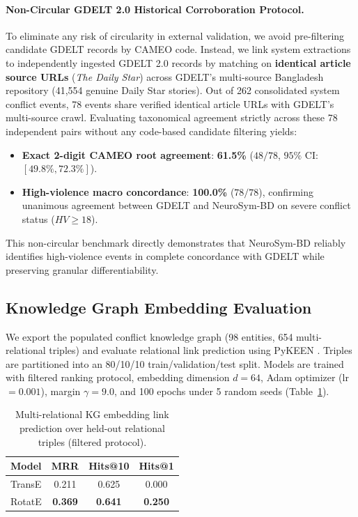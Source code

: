 \documentclass[11pt,a4paper]{article}
\begin{document}
\paragraph{Non-Circular GDELT 2.0 Historical Corroboration Protocol.}
To eliminate any risk of circularity in external validation, we avoid pre-filtering candidate GDELT records by CAMEO code. Instead, we link system extractions to independently ingested GDELT 2.0 records by matching on \textbf{identical article source URLs} (\textit{The Daily Star}) across GDELT's multi-source Bangladesh repository (41,554 genuine Daily Star stories).
Out of 262 consolidated system conflict events, 78 events share verified identical article URLs with GDELT's multi-source crawl.
Evaluating taxonomical agreement strictly across these 78 independent pairs without any code-based candidate filtering yields:
\begin{itemize}
  \item \textbf{Exact 2-digit CAMEO root agreement}: \textbf{61.5\%} ($48/78$, $95\%$ CI: $[49.8\%, 72.3\%]$).
  \item \textbf{High-violence macro concordance}: \textbf{100.0\%} ($78/78$), confirming unanimous agreement between GDELT and NeuroSym-BD on severe conflict status ($HV \ge 18$).
\end{itemize}
This non-circular benchmark directly demonstrates that NeuroSym-BD reliably identifies high-violence events in complete concordance with GDELT while preserving granular differentiability.

\subsection{Knowledge Graph Embedding Evaluation}

We export the populated conflict knowledge graph (98 entities, 654 multi-relational triples) and evaluate relational link prediction using PyKEEN \citep{ali2021}.
Triples are partitioned into an 80/10/10 train/validation/test split.
Models are trained with filtered ranking protocol, embedding dimension $d=64$, Adam optimizer (lr $= 0.001$), margin $\gamma=9.0$, and 100 epochs under 5 random seeds (Table~\ref{tab:embedding}).

\begin{table}[h]
\centering
\caption{Multi-relational KG embedding link prediction over held-out relational triples (filtered protocol).}
\label{tab:embedding}
\begin{tabular}{lccc}
\toprule
\textbf{Model} & \textbf{MRR} & \textbf{Hits@10} & \textbf{Hits@1} \\
\midrule
TransE   & 0.211 & 0.625 & 0.000 \\
RotatE   & \textbf{0.369} & \textbf{0.641} & \textbf{0.250} \\
\bottomrule
\end{tabular}
\end{table}
\end{document}
